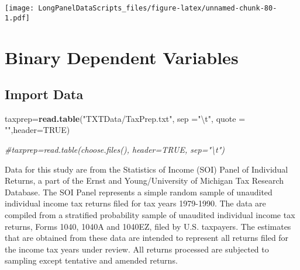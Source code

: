\documentclass[]{book}
\newenvironment{Shaded}{\begin{snugshade}}{\end{snugshade}}
\newcommand{\CharTok}[1]{\textcolor[rgb]{0.31,0.60,0.02}{#1}}
\newcommand{\CommentTok}[1]{\textcolor[rgb]{0.56,0.35,0.01}{\textit{#1}}}
\newcommand{\DataTypeTok}[1]{\textcolor[rgb]{0.13,0.29,0.53}{#1}}
\newcommand{\KeywordTok}[1]{\textcolor[rgb]{0.13,0.29,0.53}{\textbf{#1}}}
\newcommand{\NormalTok}[1]{#1}
\newcommand{\OtherTok}[1]{\textcolor[rgb]{0.56,0.35,0.01}{#1}}
\newcommand{\StringTok}[1]{\textcolor[rgb]{0.31,0.60,0.02}{#1}}
\begin{document}
\texttt{[image: LongPanelDataScripts\_files/figure-latex/unnamed-chunk-80-1.pdf]}

\hypertarget{binary-dependent-variables}{%
\chapter{Binary Dependent Variables}\label{binary-dependent-variables}}

\hypertarget{import-data-7}{%
\section{Import Data}\label{import-data-7}}

\begin{Shaded}
\begin{Highlighting}[]
\NormalTok{taxprep=}\KeywordTok{read.table}\NormalTok{(}\StringTok{"TXTData/TaxPrep.txt"}\NormalTok{, }\DataTypeTok{sep =}\StringTok{"}\CharTok{\textbackslash{}t}\StringTok{"}\NormalTok{, }\DataTypeTok{quote =} \StringTok{""}\NormalTok{,}\DataTypeTok{header=}\OtherTok{TRUE}\NormalTok{)}

\CommentTok{#taxprep=read.table(choose.files(), header=TRUE, sep="\textbackslash{}t")}
\end{Highlighting}
\end{Shaded}

Data for this study are from the Statistics of Income (SOI) Panel of Individual Returns, a part of the Ernst and Young/University of Michigan Tax Research Database. The SOI Panel represents a simple random sample of unaudited individual income tax returns filed for tax years 1979-1990. The data are compiled from a stratified probability sample of unaudited individual income tax returns, Forms 1040, 1040A and 1040EZ, filed by U.S. taxpayers. The estimates that are obtained from these data are intended to represent all returns filed for the income tax years under review. All returns processed are subjected to sampling except tentative and amended returns.
\end{document}
